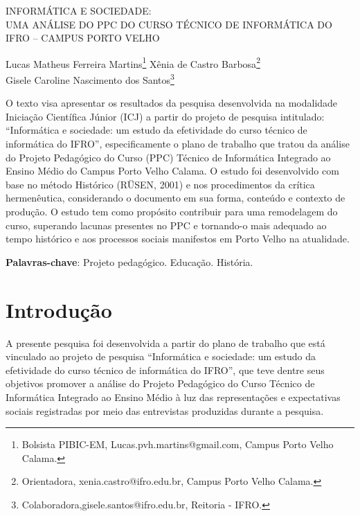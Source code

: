 \documentclass[article,12pt,onesidea,4paper,english,brazil]{abntex2}
\begin{document}
	
	
	\frenchspacing 
	
	\begin{center}
		\LARGE INFORMÁTICA E SOCIEDADE: \\UMA ANÁLISE DO PPC DO CURSO TÉCNICO DE INFORMÁTICA DO IFRO – CAMPUS PORTO VELHO
		
		\normalsize
	Lucas Matheus Ferreira Martins\footnote{Bolsista PIBIC-EM, Lucas.pvh.martins@gmail.com, Campus Porto Velho Calama.} 
	Xênia de Castro Barbosa\footnote{Orientadora, xenia.castro@ifro.edu.br, Campus Porto Velho Calama.} \\
		Gisele Caroline Nascimento dos Santos\footnote{Colaboradora,gisele.santos@ifro.edu.br, Reitoria - IFRO.}  
	\end{center}
	
	\begin{resumoumacoluna}
		O texto visa apresentar os resultados da pesquisa desenvolvida na modalidade Iniciação Científica Júnior (ICJ) a partir do projeto de pesquisa intitulado: “Informática e sociedade: um estudo da efetividade do curso técnico de informática do IFRO”, especificamente o plano de trabalho que tratou da análise do Projeto Pedagógico do Curso (PPC) Técnico de Informática Integrado ao Ensino Médio do Campus Porto Velho Calama. O estudo foi desenvolvido com base no método Histórico (RÜSEN, 2001) e nos procedimentos da crítica hermenêutica, considerando o documento em sua forma, conteúdo e contexto de produção. O estudo tem como propósito contribuir para uma remodelagem do curso, superando lacunas presentes no PPC e tornando-o mais adequado ao tempo histórico e aos processos sociais manifestos em Porto Velho na atualidade.
		
		\vspace{\onelineskip}
		
		\noindent
		\textbf{Palavras-chave}: Projeto pedagógico. Educação. História.
		
		
	\end{resumoumacoluna}
	
	\section*{Introdução}
	
	A presente pesquisa foi desenvolvida a partir do plano de trabalho que está vinculado ao projeto de pesquisa “Informática e sociedade: um estudo da efetividade do curso técnico de informática do IFRO”, que teve dentre seus objetivos promover a análise do Projeto Pedagógico do Curso Técnico de Informática Integrado ao Ensino Médio à luz das representações e expectativas sociais registradas por meio das entrevistas produzidas durante a pesquisa.
	
\end{document}
